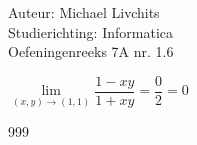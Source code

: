 \documentclass[a4paper]{article}
\begin{document}
  
\noindent \large Auteur: Michael Livchits \\
\noindent \large Studierichting: Informatica\\
\noindent \large Oefeningenreeks 7A nr. 1.6\\

\medskip

\normalsize

$\lim\limits_{(x,y)\rightarrow(1,1)}\dfrac{1-xy}{1+xy} = \dfrac{0}{2} = 0$\\

\begin{thebibliography}{999}
\end{thebibliography}
\end{document}
